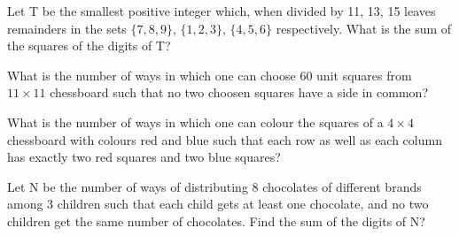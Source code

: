 \item Let T be the smallest positive integer which, when divided by 11, 13, 15 leaves remainders in the sets 
$\{7, 8, 9\}$, $\{1, 2, 3\}$, $\{4, 5, 6\}$ respectively. What is the sum of the squares of the digits of T?

\item What is the number of ways in which one can choose 60 unit squares from $11 \times 11$ chessboard such that no two choosen squares have a side in common?

\item What is the number of ways in which one can colour the squares of a $4 \times 4$ chessboard with colours red and blue such that each row as well as each column has exactly two red squares and two blue squares?

\item Let N be the number of ways of distributing 8 chocolates of different brands among 3 children such that each child gets at least one chocolate, and no two children get the same number of chocolates. Find the sum of the digits of N?
